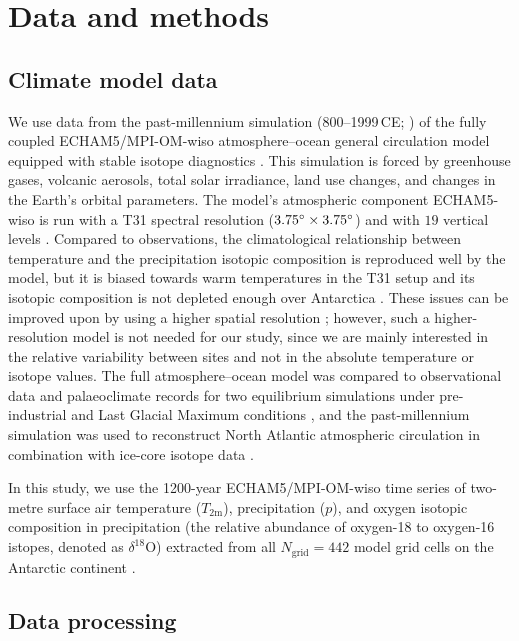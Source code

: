 \documentclass[cp, manuscript]{copernicus}
\begin{document}
\section{Data and methods}\label{methods}

\subsection{Climate model data}\label{methods:data}

We use data from the past-millennium simulation
(800--1999\,CE; \citealp{Sjolte2018}) of the fully coupled ECHAM5/MPI-OM-wiso
atmosphere--ocean general circulation model equipped with stable isotope
diagnostics \citep{Werner2016}. This simulation is forced by greenhouse gases,
volcanic aerosols, total solar irradiance, land use changes, and changes in the
Earth's orbital parameters. The model's atmospheric component ECHAM5-wiso is run
with a T31 spectral resolution ($3.75^{\circ}\times3.75^{\circ}$) and
with $19$ vertical levels \citep{Sjolte2018}. Compared to observations, the
climatological relationship between temperature and the precipitation isotopic
composition is reproduced well by the model, but it is biased towards warm
temperatures in the T31 setup and its isotopic composition is not depleted
enough over Antarctica \citep{Werner2011}. These issues can be improved upon by
using a higher spatial resolution \citep{Werner2011}; however, such a
higher-resolution model is not needed for our study, since we are mainly
interested in the relative variability between sites and not in the absolute
temperature or isotope values. The full atmosphere--ocean model was compared to
observational data and palaeoclimate records for two equilibrium simulations
under pre-industrial and Last Glacial Maximum conditions \citep{Werner2016}, and
the past-millennium simulation was used to reconstruct North Atlantic
atmospheric circulation in combination with ice-core isotope data
\citep{Sjolte2018}.

In this study, we use the 1200-year ECHAM5/MPI-OM-wiso time series of two-metre
surface air temperature ($T_{2\mathrm{m}}$), precipitation ($p$), and oxygen
isotopic composition in precipitation (the relative abundance of oxygen-18 to
oxygen-16 istopes, denoted as $\delta^{18}\mathrm{O}$) extracted from all
$N_{\mathrm{grid}}=442$ model grid cells on the Antarctic continent
\citep{Munch2020}.

\subsection{Data processing}\label{methods:prc}
\end{document}
